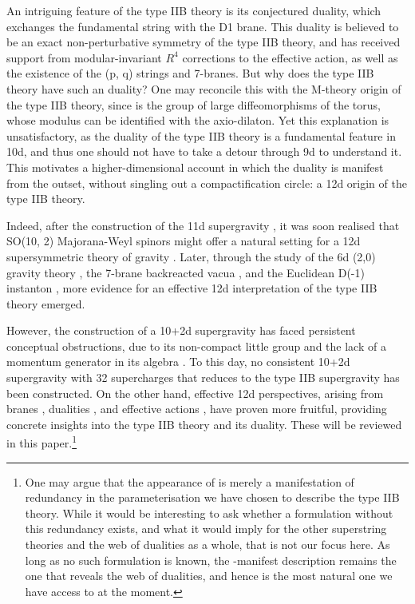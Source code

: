 An intriguing feature of the type IIB theory is its conjectured \SLZ{} duality, which exchanges the fundamental string with the D1 brane.
This duality is believed to be an exact non-perturbative symmetry of the type IIB theory, and has received support from modular-invariant $R^4$ corrections to the effective action, as well as the existence of the (p, q) strings and 7-branes.
But why does the type IIB theory have such an \SLZ{} duality?
One may reconcile this with the M-theory origin of the type IIB theory, since \SLZ{} is the group of large diffeomorphisms of the torus, whose modulus can be identified with the axio-dilaton.
Yet this explanation is unsatisfactory, as the \SLZ{} duality of the type IIB theory is a fundamental feature in 10d, and thus one should not have to take a detour through 9d to understand it.
This motivates a higher-dimensional account in which the duality is manifest from the outset, without singling out a compactification circle: a 12d origin of the type IIB theory.

Indeed, after the construction of the 11d supergravity \cite{Nahm:1977tg,Cremmer1978}, it was soon realised that SO(10, 2) Majorana-Weyl spinors might offer a natural setting for a 12d supersymmetric theory of gravity \cite{Castellani:1982ke,Blencowe:1988sk}.
Later, through the study of the 6d (2,0) gravity theory \cite{Hull:1995xh,Witten:1995em}, the 7-brane backreacted vacua \cite{Vafa:1996xn}, and the Euclidean D(-1) instanton \cite{Tseytlin:1996it}, more evidence for an effective 12d interpretation of the type IIB theory emerged.

However, the construction of a 10+2d supergravity \cite{Nishino:1997gq} has faced persistent conceptual obstructions, due to its non-compact little group and the lack of a momentum generator in its algebra \cite{Hewson:1997wv}.
To this day, no consistent 10+2d supergravity with 32 supercharges that reduces to the type IIB supergravity has been constructed. 
On the other hand, effective 12d perspectives, arising from branes \cite{Tseytlin:1996ne}, dualities \cite{Tseytlin:1996it}, and effective actions \cite{Minasian:2015bxa}, have proven more fruitful, providing concrete insights into the type IIB theory and its \SLZ{} duality.
These will be reviewed in this paper.\footnote{
One may argue that the appearance of \SLZ{} is merely a manifestation of redundancy in the parameterisation we have chosen to describe the type IIB theory.
While it would be interesting to ask whether a formulation without this redundancy exists, and what it would imply for the other superstring theories and the web of dualities as a whole, that is not our focus here.
As long as no such formulation is known, the \SLZ{}-manifest description remains the one that reveals the web of dualities, and hence is the most natural one we have access to at the moment.
}

